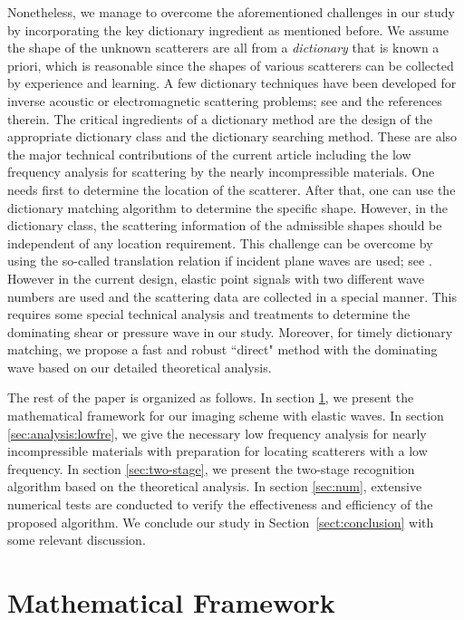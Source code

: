\documentclass[a4paper,11pt]{article}
\theoremstyle{remark}
\theoremstyle{definition}
\numberwithin{equation}{section}
\begin{document}
Nonetheless, we manage to overcome the aforementioned challenges in our study by incorporating the key dictionary ingredient as mentioned before. We assume the shape of the unknown scatterers are all from a \emph{dictionary} that is known a priori, which is reasonable since the shapes of various scatterers can be collected by experience and learning.
A few dictionary techniques have been developed for inverse acoustic or electromagnetic scattering problems; see \cite{AA1, AA2, AA3, LWY} and the references therein. The critical ingredients of a dictionary method are the design of the appropriate dictionary class and the dictionary searching method. These are also the major technical contributions of the current article including the low frequency analysis for scattering by the nearly incompressible materials.
One needs first to determine the location of the scatterer. After that, one can use the dictionary matching algorithm to determine the specific shape. However, in the dictionary class, the scattering information of the admissible shapes should be independent of any location requirement. This challenge can be overcome by using the so-called translation relation if incident plane waves are used; see \cite{AA1, AA2, AA3, LWY, LLS}. However in the current design, elastic point signals with two different wave numbers are used and the scattering data are collected in a special manner. This requires some special technical analysis and treatments to determine the dominating shear or pressure wave in our study. Moreover, for timely dictionary matching, we propose a fast and robust ``direct" method with the dominating wave based on our detailed theoretical analysis.

The rest of the paper is organized as follows. In section \ref{sec:mathground}, we present the mathematical framework for our imaging scheme with elastic waves. In section \ref{sec:analysis:lowfre}, we give the necessary low frequency analysis for nearly incompressible materials with preparation for locating scatterers with a low frequency.  In section \ref{sec:two-stage}, we present the two-stage recognition algorithm based on the theoretical analysis. In section \ref{sec:num}, extensive numerical tests are conducted to verify the effectiveness and efficiency of the proposed algorithm. We conclude our study in Section~\ref{sect:conclusion} with some relevant discussion.

\section{Mathematical Framework}\label{sec:mathground} %
\end{document}
